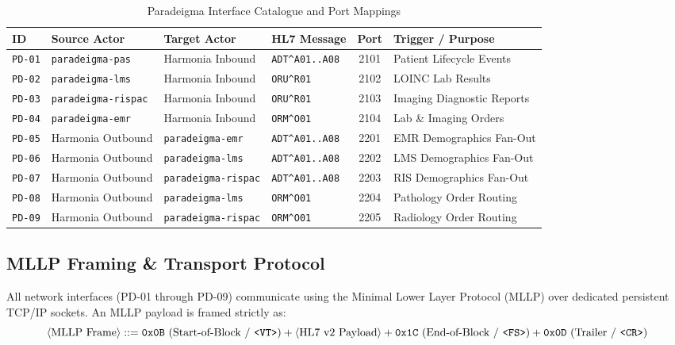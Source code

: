 \begin{table}[htbp]
\centering
\small
\begin{tabularx}{\textwidth}{l p{2.2cm} p{2.2cm} p{2.5cm} c p{2.5cm}}
\toprule
\textbf{ID} & \textbf{Source Actor} & \textbf{Target Actor} & \textbf{HL7 Message} & \textbf{Port} & \textbf{Trigger / Purpose} \\
\midrule
\texttt{PD-01} & \texttt{paradeigma-pas} & Harmonia Inbound & \texttt{ADT\^{}A01..A08} & 2101 & Patient Lifecycle Events \\
\texttt{PD-02} & \texttt{paradeigma-lms} & Harmonia Inbound & \texttt{ORU\^{}R01} & 2102 & LOINC Lab Results \\
\texttt{PD-03} & \texttt{paradeigma-rispac} & Harmonia Inbound & \texttt{ORU\^{}R01} & 2103 & Imaging Diagnostic Reports \\
\texttt{PD-04} & \texttt{paradeigma-emr} & Harmonia Inbound & \texttt{ORM\^{}O01} & 2104 & Lab \& Imaging Orders \\
\texttt{PD-05} & Harmonia Outbound & \texttt{paradeigma-emr} & \texttt{ADT\^{}A01..A08} & 2201 & EMR Demographics Fan-Out \\
\texttt{PD-06} & Harmonia Outbound & \texttt{paradeigma-lms} & \texttt{ADT\^{}A01..A08} & 2202 & LMS Demographics Fan-Out \\
\texttt{PD-07} & Harmonia Outbound & \texttt{paradeigma-rispac} & \texttt{ADT\^{}A01..A08} & 2203 & RIS Demographics Fan-Out \\
\texttt{PD-08} & Harmonia Outbound & \texttt{paradeigma-lms} & \texttt{ORM\^{}O01} & 2204 & Pathology Order Routing \\
\texttt{PD-09} & Harmonia Outbound & \texttt{paradeigma-rispac} & \texttt{ORM\^{}O01} & 2205 & Radiology Order Routing \\
\bottomrule
\end{tabularx}
\caption{Paradeigma Interface Catalogue and Port Mappings}
\label{tab:paradeigma_interfaces}
\end{table}

\subsection{MLLP Framing \& Transport Protocol}

All network interfaces (PD-01 through PD-09) communicate using the Minimal Lower Layer Protocol (MLLP) over dedicated persistent TCP/IP sockets. An MLLP payload is framed strictly as:
\begin{equation}
\langle\text{MLLP Frame}\rangle ::= \texttt{0x0B}\ (\text{Start-of-Block / \texttt{<VT>}}) + \langle\text{HL7 v2 Payload}\rangle + \texttt{0x1C}\ (\text{End-of-Block / \texttt{<FS>}}) + \texttt{0x0D}\ (\text{Trailer / \texttt{<CR>}})
\end{equation}


